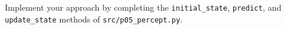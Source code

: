 \item {} Implement your approach by completing the
\texttt{initial\_state}, \texttt{predict}, and \texttt{update\_state} methods
of \texttt{src/p05\_percept.py}.

